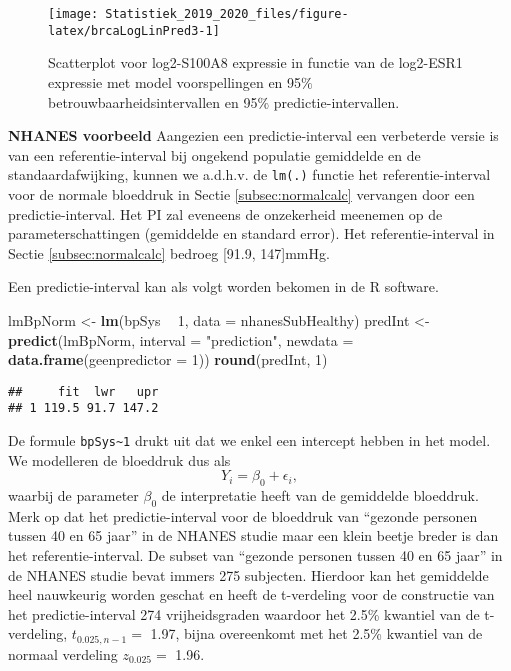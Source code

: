 \documentclass[12pt,dutch,coursenotes]{book}
\newenvironment{Shaded}{\begin{snugshade}}{\end{snugshade}}
\newcommand{\KeywordTok}[1]{\textcolor[rgb]{0.13,0.29,0.53}{\textbf{#1}}}
\newcommand{\DataTypeTok}[1]{\textcolor[rgb]{0.13,0.29,0.53}{#1}}
\newcommand{\DecValTok}[1]{\textcolor[rgb]{0.00,0.00,0.81}{#1}}
\newcommand{\StringTok}[1]{\textcolor[rgb]{0.31,0.60,0.02}{#1}}
\newcommand{\OperatorTok}[1]{\textcolor[rgb]{0.81,0.36,0.00}{\textbf{#1}}}
\newcommand{\NormalTok}[1]{#1}
\theoremstyle{definition}
\theoremstyle{definition}
\theoremstyle{definition}
\theoremstyle{remark}
\begin{document}
\begin{figure}

{\centering \texttt{[image: Statistiek\_2019\_2020\_files/figure-latex/brcaLogLinPred3-1]} 

}

\caption{Scatterplot voor log2-S100A8 expressie in functie van de log2-ESR1 expressie met model voorspellingen en 95$\%$ betrouwbaarheidsintervallen en 95$\%$ predictie-intervallen.}\label{fig:brcaLogLinPred3}
\end{figure}

\textbf{NHANES voorbeeld} Aangezien een predictie-interval een
verbeterde versie is van een referentie-interval bij ongekend populatie
gemiddelde en de standaardafwijking, kunnen we a.d.h.v. de
\texttt{lm(.)} functie het referentie-interval voor de normale bloeddruk
in Sectie \ref{subsec:normalcalc} vervangen door een predictie-interval.
Het PI zal eveneens de onzekerheid meenemen op de parameterschattingen
(gemiddelde en standard error). Het referentie-interval in Sectie
\ref{subsec:normalcalc} bedroeg {[}91.9, 147{]}mmHg.

Een predictie-interval kan als volgt worden bekomen in de R software.

\begin{Shaded}
\begin{Highlighting}[]
\NormalTok{lmBpNorm <-}\StringTok{ }\KeywordTok{lm}\NormalTok{(bpSys }\OperatorTok{~}\StringTok{ }\DecValTok{1}\NormalTok{, }\DataTypeTok{data =}\NormalTok{ nhanesSubHealthy)}
\NormalTok{predInt <-}\StringTok{ }\KeywordTok{predict}\NormalTok{(lmBpNorm, }\DataTypeTok{interval =} \StringTok{"prediction"}\NormalTok{, }
    \DataTypeTok{newdata =} \KeywordTok{data.frame}\NormalTok{(}\DataTypeTok{geenpredictor =} \DecValTok{1}\NormalTok{))}
\KeywordTok{round}\NormalTok{(predInt, }\DecValTok{1}\NormalTok{)}
\end{Highlighting}
\end{Shaded}

\begin{verbatim}
##     fit  lwr   upr
## 1 119.5 91.7 147.2
\end{verbatim}

De formule \texttt{bpSys\textasciitilde{}1} drukt uit dat we enkel een
intercept hebben in het model. We modelleren de bloeddruk dus als
\[Y_i=\beta_0 + \epsilon_i,\] waarbij de parameter \(\beta_0\) de
interpretatie heeft van de gemiddelde bloeddruk. Merk op dat het
predictie-interval voor de bloeddruk van ``gezonde personen tussen 40 en
65 jaar'' in de NHANES studie maar een klein beetje breder is dan het
referentie-interval. De subset van ``gezonde personen tussen 40 en 65
jaar'' in de NHANES studie bevat immers 275 subjecten. Hierdoor kan het
gemiddelde heel nauwkeurig worden geschat en heeft de t-verdeling voor
de constructie van het predictie-interval 274 vrijheidsgraden waardoor
het 2.5\% kwantiel van de t-verdeling, \(t_{0.025,n-1}=\) 1.97, bijna
overeenkomt met het 2.5\% kwantiel van de normaal verdeling
\(z_{0.025}=\) 1.96.
\end{document}
